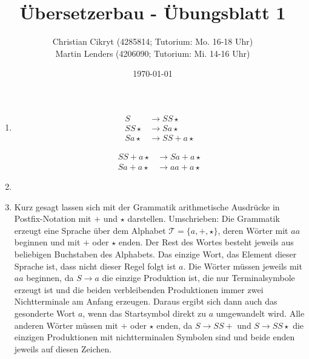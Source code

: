 \documentclass[a4paper,10pt]{scrartcl}
\title{Übersetzerbau - Übungsblatt 1}
\author{Christian Cikryt (4285814; Tutorium: Mo. 16-18 Uhr)\\Martin Lenders (4206090; Tutorium: Mi. 14-16 Uhr)}
\date{\today}
\begin{document}
\maketitle

\section{}
\begin{enumerate}
 \item	\begin{minipage}[t]{0.4\textwidth}
	  \begin{align*}
	    S & \to SS\star \tag{$S \to SS\star$} \\
	    SS\star & \to Sa\star \tag{$S \to a$} \\
	    Sa\star & \to SS+a\star \tag{$S \to SS+$}
	  \end{align*}
	\end{minipage}
	\begin{minipage}[t]{0.4\textwidth}
	  \begin{align*}
	    SS+a\star & \to Sa+a\star \tag{$S \to a$} \\
	    Sa+a\star & \to aa+a\star \tag{$S \to a$}
	  \end{align*}
	\end{minipage}
 \item	\begin{minipage}[t]{0.8\textwidth}
	  \centering
	\end{minipage}
 \item	Kurz gesagt lassen sich mit der Grammatik arithmetische Ausdrücke in Postfix-Notation mit $+$ und $\star$ darstellen.
	Umschrieben: Die Grammatik erzeugt eine Sprache über dem Alphabet $\mathcal{T} = \{a,
	+, \star\}$, deren Wörter mit $aa$ beginnen und mit $+$ oder $\star$
  enden.
	Der Rest des Wortes besteht jeweils aus beliebigen Buchstaben des
  Alphabets.
	Das einzige Wort, das Element dieser Sprache ist, dass nicht dieser
Regel folgt ist $a$.
	Die Wörter müssen jeweils mit $aa$ beginnen, da $S \to a$ die einzige
	Produktion ist, die nur Terminalsymbole erzeugt ist und die beiden
	verbleibenden Produktionen immer zwei Nichtterminale am Anfang erzeugen.
	Daraus ergibt sich dann auch das gesonderte Wort $a$, wenn das
Startsymbol direkt zu $a$ umgewandelt wird. 
	Alle anderen Wörter müssen mit $+$ oder $\star$ enden, da $S \to SS+$
und $S \to SS\star$ die einzigen Produktionen mit nichtterminalen Symbolen sind
 und beide enden jeweils auf diesen Zeichen.
\end{enumerate}
\end{document}
